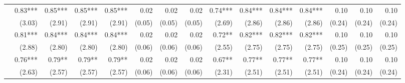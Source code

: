 \begin{tabularx}{1.45\textwidth}{lRRRRRRRRRRRRRR}
		 & \num{0.83}***\phantom{)} & \num{0.85}***\phantom{)} & \num{0.85}***\phantom{)} & \num{0.85}***\phantom{)} & \num{0.02}\phantom{***)} & \num{0.02}\phantom{***)} & \num{0.02}\phantom{***)} & \num{0.74}***\phantom{)} & \num{0.84}***\phantom{)} & \num{0.84}***\phantom{)} & \num{0.84}***\phantom{)} & \num{0.10}\phantom{***)} & \num{0.10}\phantom{***)} & \num{0.10}\phantom{***)} \\
		 & (\num{3.03})\phantom{***} & (\num{2.91})\phantom{***} & (\num{2.91})\phantom{***} & (\num{2.91})\phantom{***} & (\num{0.05})\phantom{***} & (\num{0.05})\phantom{***} & (\num{0.05})\phantom{***} & (\num{2.69})\phantom{***} & (\num{2.86})\phantom{***} & (\num{2.86})\phantom{***} & (\num{2.86})\phantom{***} & (\num{0.24})\phantom{***} & (\num{0.24})\phantom{***} & (\num{0.24})\phantom{***} \\ [\dspacing]
		 & \num{0.81}***\phantom{)} & \num{0.84}***\phantom{)} & \num{0.84}***\phantom{)} & \num{0.84}***\phantom{)} & \num{0.02}\phantom{***)} & \num{0.02}\phantom{***)} & \num{0.02}\phantom{***)} & \num{0.72}**\phantom{*)} & \num{0.82}***\phantom{)} & \num{0.82}***\phantom{)} & \num{0.82}***\phantom{)} & \num{0.10}\phantom{***)} & \num{0.10}\phantom{***)} & \num{0.10}\phantom{***)} \\
		 & (\num{2.88})\phantom{***} & (\num{2.80})\phantom{***} & (\num{2.80})\phantom{***} & (\num{2.80})\phantom{***} & (\num{0.06})\phantom{***} & (\num{0.06})\phantom{***} & (\num{0.06})\phantom{***} & (\num{2.55})\phantom{***} & (\num{2.75})\phantom{***} & (\num{2.75})\phantom{***} & (\num{2.75})\phantom{***} & (\num{0.25})\phantom{***} & (\num{0.25})\phantom{***} & (\num{0.25})\phantom{***} \\ [\dspacing]
		 & \num{0.76}***\phantom{)} & \num{0.79}**\phantom{*)} & \num{0.79}**\phantom{*)} & \num{0.79}**\phantom{*)} & \num{0.02}\phantom{***)} & \num{0.02}\phantom{***)} & \num{0.02}\phantom{***)} & \num{0.67}**\phantom{*)} & \num{0.77}**\phantom{*)} & \num{0.77}**\phantom{*)} & \num{0.77}**\phantom{*)} & \num{0.10}\phantom{***)} & \num{0.10}\phantom{***)} & \num{0.10}\phantom{***)} \\
		 & (\num{2.63})\phantom{***} & (\num{2.57})\phantom{***} & (\num{2.57})\phantom{***} & (\num{2.57})\phantom{***} & (\num{0.06})\phantom{***} & (\num{0.06})\phantom{***} & (\num{0.06})\phantom{***} & (\num{2.31})\phantom{***} & (\num{2.51})\phantom{***} & (\num{2.51})\phantom{***} & (\num{2.51})\phantom{***} & (\num{0.24})\phantom{***} & (\num{0.24})\phantom{***} & (\num{0.24})\phantom{***} \\ [\dspacing]

\end{tabularx}

